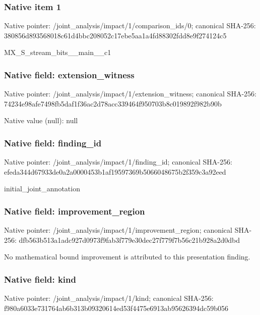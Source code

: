 \documentclass[10pt,a4paper]{article}
\begin{document}
\subsubsection{Native item 1}
Native pointer: /joint\_\allowbreak{}analysis/impact/1/comparison\_\allowbreak{}ids/0; canonical SHA-256: 380856d893568018c61d4bbc208052c17ebe5aa1a4fd88302fdd8e9f274124c5

\begingroup\raggedright\sloppy MX\_\allowbreak{}S\_\allowbreak{}stream\_\allowbreak{}bits\_\allowbreak{}\_\allowbreak{}main\_\allowbreak{}\_\allowbreak{}c1\par\endgroup

\subsubsection{Native field: extension\_\allowbreak{}witness}
Native pointer: /joint\_\allowbreak{}analysis/impact/1/extension\_\allowbreak{}witness; canonical SHA-256: 74234e98afe7498fb5daf1f36ac2d78acc339464f950703b8c019892f982b90b

Native value (null): null

\subsubsection{Native field: finding\_\allowbreak{}id}
Native pointer: /joint\_\allowbreak{}analysis/impact/1/finding\_\allowbreak{}id; canonical SHA-256: efeda344d67933de0a2a0000453b1af19597369b5066048675b2f359c3a92eed

\begingroup\raggedright\sloppy initial\_\allowbreak{}joint\_\allowbreak{}annotation\par\endgroup

\subsubsection{Native field: improvement\_\allowbreak{}region}
Native pointer: /joint\_\allowbreak{}analysis/impact/1/improvement\_\allowbreak{}region; canonical SHA-256: dfb563b513a1adc927d0973f9fab3f779e30dec27f779f7b56c21b928a2d0dbd

\begingroup\raggedright\sloppy No mathematical bound improvement is attributed to this presentation finding.\par\endgroup

\subsubsection{Native field: kind}
Native pointer: /joint\_\allowbreak{}analysis/impact/1/kind; canonical SHA-256: f980a6033e731764ab6b313b09320614ed53f4475e6913ab95626394dc59b056
\end{document}
